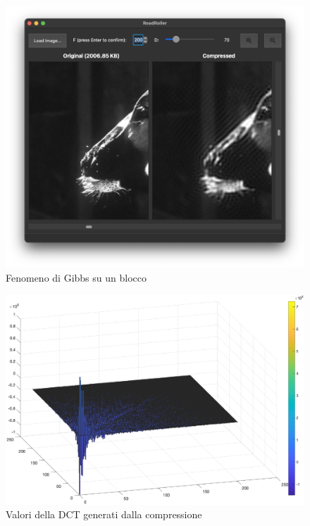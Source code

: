 \begin{figure}[h]
	\centering
	\includegraphics[width=1\linewidth]{figures/gibbs_phenomenon}
	\caption{Fenomeno di Gibbs su un blocco}
	\label{fig:gibbs}
\end{figure}

\begin{figure}[h]
	\centering
	\includegraphics[width=1\linewidth]{figures/dct_values_3d.eps}
	\caption{Valori della DCT generati dalla compressione}
	\label{fig:dct_values_on_gibbs}
\end{figure}
